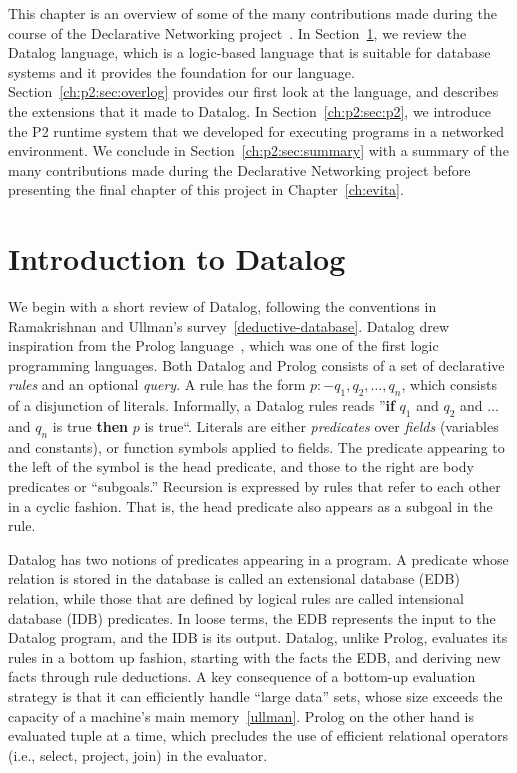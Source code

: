 This chapter is an overview of some of the many contributions made during the
course of the Declarative Networking project~\cite{boon-thesis}.  In
Section~\ref{ch:p2:sec:datalog}, we review the Datalog language, which is a
logic-based language that is suitable for database systems and it provides the
foundation for our \OVERLOG language.  Section~\ref{ch:p2:sec:overlog} provides
our first look at the \OVERLOG language, and describes the extensions that it
made to Datalog.  In Section~\ref{ch:p2:sec:p2}, we introduce the P2 runtime
system that we developed for executing \OVERLOG programs in a networked
environment.  We conclude in Section~\ref{ch:p2:sec:summary} with a summary of
the many contributions made during the Declarative Networking project before
presenting the final chapter of this project in Chapter~\ref{ch:evita}.

\section{Introduction to Datalog}
\label{ch:p2:sec:datalog}

We begin with a short review of Datalog, following the conventions in
Ramakrishnan and Ullman's survey~\ref{deductive-database}.  Datalog drew
inspiration from the Prolog language~\cite{prolog}, which was one of the first
logic programming languages.  Both Datalog and Prolog consists of a set of
declarative {\em rules} and an optional {\em query}.  A rule has the form $p :-
q_1, q_2, \ldots, q_n$, which consists of a disjunction of literals.
Informally, a Datalog rules reads ''{\bf if} $q_1$ and $q_2$ and $\ldots$ and
$q_n$ is true {\bf then} $p$ is true``.  Literals are either {\em predicates}
over {\em fields} (variables and constants), or function symbols applied to
fields.  The predicate appearing to the left of the \ol{:-} symbol is the
head predicate, and those to the right are body predicates or ``subgoals.'' 
Recursion is expressed by rules that refer to each other in a cyclic
fashion. That is, the head predicate also appears as a subgoal in the rule.

Datalog has two notions of predicates appearing in a program.  A predicate
whose relation is stored in the database is called an extensional database
(EDB) relation, while those that are defined by logical rules are called
intensional database (IDB) predicates.  In loose terms, the EDB represents the
input to the Datalog program, and the IDB is its output.  Datalog, unlike
Prolog, evaluates its rules in a bottom up fashion, starting with the facts the
EDB, and deriving new facts through rule deductions.  A key consequence of a
bottom-up evaluation strategy is that it can efficiently handle ``large data''
sets, whose size exceeds the capacity of a machine's main memory~\ref{ullman}.
Prolog on the other hand is evaluated tuple at a time, which precludes the
use of efficient relational operators (i.e., select, project, join) in
the evaluator.

